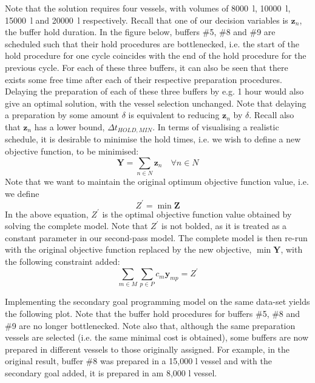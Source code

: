 Note that the solution requires four vessels, with volumes of
\SI{8000}{\litre}, \SI{10000}{\litre}, \SI{15000}{\litre} and
\SI{20000}{\litre} respectively.  
Recall that one of our decision variables is $\boldsymbol{z}_{n}$, the buffer
hold duration.
In the figure below, buffers \#5, \#8 and \#9 are scheduled such that their 
hold procedures are bottlenecked, i.e. the start of the hold procedure for one
cycle coincides with the end of the hold procedure for the previous cycle.
For each of these three buffers, it can also be seen that there exists some
free time after each of their respective preparation procedures.
Delaying the preparation of each of these three buffers by e.g. 1 hour would
also give an optimal solution, with the vessel selection unchanged.
Note that delaying a preparation by some amount $\delta$ is equivalent to 
reducing $\boldsymbol{z}_{n}$ by $\delta$.
Recall also that $\boldsymbol{z}_{n}$ has a lower bound, 
$\Delta t_{\mathit{HOLD,MIN}}$.
In terms of visualising a realistic schedule, it is desirable to minimise the
hold times, i.e. we wish to define a new objective function, to be minimised:
\begin{equation}
    \boldsymbol{Y} = \sum_{n \in N} \boldsymbol{z}_{n} \quad \forall n \in N
    \label{eq.objfn2}
\end{equation}
Note that we want to maintain the original optimum objective function value,
i.e. we define
\begin{equation}
    Z^{\prime} = \min \boldsymbol{Z}
\end{equation}
In the above equation, $Z^{\prime}$ is the optimal objective function value obtained by solving
the complete model.
Note that $Z^{\prime}$ is not bolded, as it is treated as a constant parameter
in our second-pass model.
The complete model is then re-run with the original objective function replaced
by the new objective, $\min \boldsymbol{Y}$, with the following constraint
added:
\begin{equation}
    \sum_{m \in M} \sum_{p \in P} c_m \boldsymbol{y}_{mp} = Z^{\prime}
    \label{eq.constr10}
\end{equation}

Implementing the secondary goal programming model on the same data-set yields
the following plot.
Note that the buffer hold procedures for buffers \#5, \#8 and \#9 are no longer
bottlenecked.
Note also that, although the same preparation vessels are selected (i.e. the
same minimal cost is obtained), some buffers are now prepared in different
vessels to those originally assigned.
For example, in the original result, buffer \#8 was prepared in a 15,000 l
vessel and with the secondary goal added, it is prepared in am 8,000 l vessel.

